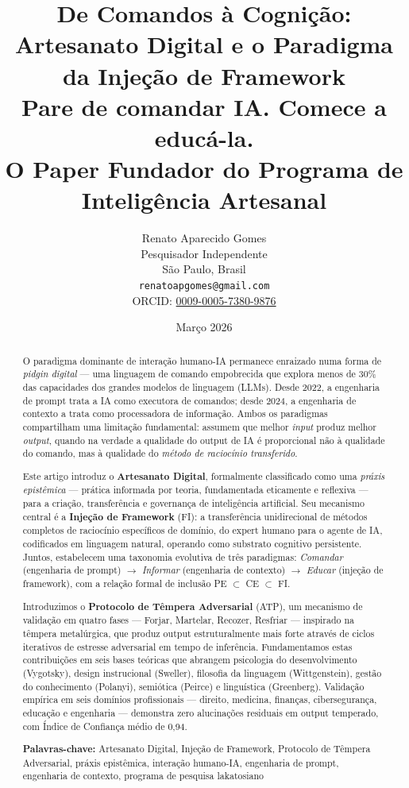\documentclass[12pt,a4paper]{article}
\title{%
  \vspace{-1cm}
  \textbf{De Comandos à Cognição:\\
  Artesanato Digital e o Paradigma da Injeção de Framework}\\[0.5em]
  \large Pare de comandar IA. Comece a educá-la.\\[0.3em]
  \normalsize O Paper Fundador do Programa de Inteligência Artesanal
}
\author{
  Renato Aparecido Gomes\\
  Pesquisador Independente\\
  São Paulo, Brasil\\
  \texttt{renatoapgomes@gmail.com}\\
  ORCID: \href{https://orcid.org/0009-0005-7380-9876}{0009-0005-7380-9876}
}
\date{Março 2026}
\begin{document}
\maketitle
\thispagestyle{empty}

\begin{abstract}
\noindent
O paradigma dominante de interação humano-IA permanece enraizado numa forma de \emph{pidgin digital} --- uma linguagem de comando empobrecida que explora menos de 30\% das capacidades dos grandes modelos de linguagem (LLMs). Desde 2022, a engenharia de prompt trata a IA como executora de comandos; desde 2024, a engenharia de contexto a trata como processadora de informação. Ambos os paradigmas compartilham uma limitação fundamental: assumem que melhor \emph{input} produz melhor \emph{output}, quando na verdade a qualidade do output de IA é proporcional não à qualidade do comando, mas à qualidade do \emph{método de raciocínio transferido}.

Este artigo introduz o \textbf{Artesanato Digital}, formalmente classificado como uma \emph{práxis epistêmica} --- prática informada por teoria, fundamentada eticamente e reflexiva --- para a criação, transferência e governança de inteligência artificial. Seu mecanismo central é a \textbf{Injeção de Framework} (FI): a transferência unidirecional de métodos completos de raciocínio específicos de domínio, do expert humano para o agente de IA, codificados em linguagem natural, operando como substrato cognitivo persistente. Juntos, estabelecem uma taxonomia evolutiva de três paradigmas: \emph{Comandar} (engenharia de prompt) $\to$ \emph{Informar} (engenharia de contexto) $\to$ \emph{Educar} (injeção de framework), com a relação formal de inclusão PE $\subset$ CE $\subset$ FI.

Introduzimos o \textbf{Protocolo de Têmpera Adversarial} (ATP), um mecanismo de validação em quatro fases --- Forjar, Martelar, Recozer, Resfriar --- inspirado na têmpera metalúrgica, que produz output estruturalmente mais forte através de ciclos iterativos de estresse adversarial em tempo de inferência. Fundamentamos estas contribuições em seis bases teóricas que abrangem psicologia do desenvolvimento (Vygotsky), design instrucional (Sweller), filosofia da linguagem (Wittgenstein), gestão do conhecimento (Polanyi), semiótica (Peirce) e linguística (Greenberg). Validação empírica em seis domínios profissionais --- direito, medicina, finanças, cibersegurança, educação e engenharia --- demonstra zero alucinações residuais em output temperado, com Índice de Confiança médio de 0,94.

\medskip
\noindent\textbf{Palavras-chave:} Artesanato Digital, Injeção de Framework, Protocolo de Têmpera Adversarial, práxis epistêmica, interação humano-IA, engenharia de prompt, engenharia de contexto, programa de pesquisa lakatosiano
\end{abstract}
\end{document}
